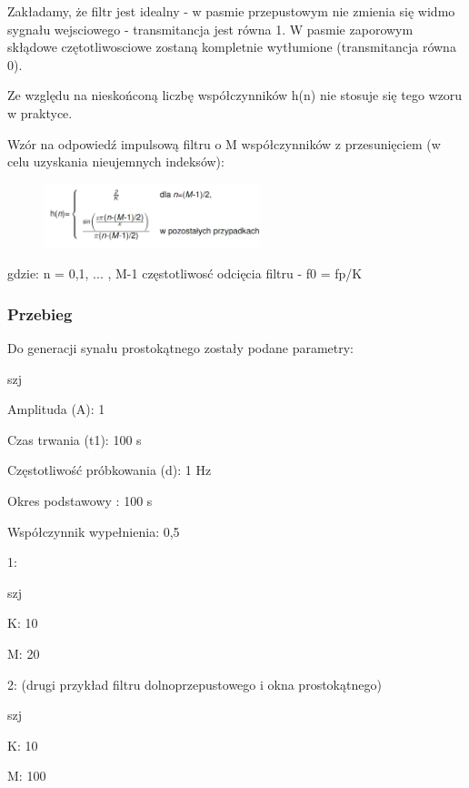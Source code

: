 \documentclass[12pt]{article}
\begin{document}
Zakładamy, że filtr jest idealny -  w pasmie przepustowym nie zmienia się widmo sygnału wejsciowego -  transmitancja jest równa  1. W pasmie zaporowym skłądowe czętotliwosciowe zostaną kompletnie wytłumione (transmitancja równa 0).

Ze względu na nieskońconą liczbę współczynników h(n) nie stosuje się tego wzoru w praktyce.

Wzór na odpowiedź impulsową filtru o M współczynników z przesunięciem (w celu uzyskania nieujemnych indeksów):

\begin{figure}[h!]
 \centering
 \includegraphics[width=6.3cm]{f.PNG}
 \vspace{-0.3cm}
 \label{gw}
\end{figure}

gdzie:
\subitem n = 0,1, ... , M-1
\subitem częstotliwosć odcięcia filtru - f0 =  fp/K

\subsubsection{Przebieg}
Do generacji synału prostokątnego zostały podane parametry:

\begin{labeling}{szj}
\item [Amplituda (A):] 1
\item [Czas trwania (t1):] 100 s
\item [Częstotliwość próbkowania (d): ] 1 Hz
\item [Okres podstawowy :] 100 s
\item [Współczynnik wypełnienia:] 0,5
\end{labeling}


1:
\begin{labeling}{szj}
\item [K:] 10
\item [M:] 20 
\end{labeling}

2: (drugi przykład filtru dolnoprzepustowego i okna prostokątnego)

\begin{labeling}{szj}
\item [K:] 10
\item [M:] 100 
\end{labeling}
\end{document}
